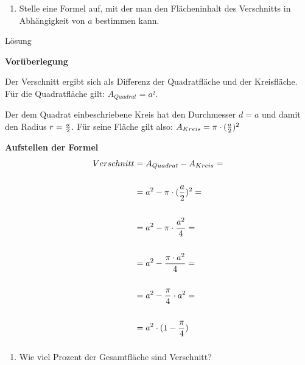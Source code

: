 \documentclass[
  ngerman,
]{book}
\providecommand{\tightlist}{%
  \setlength{\itemsep}{0pt}\setlength{\parskip}{0pt}}
\begin{document}
\hypertarget{section-42}{%
\subsubsection*{}\label{section-42}}

\begin{enumerate}
\def\labelenumi{\alph{enumi})}
\setcounter{enumi}{1}
\tightlist
\item
  Stelle eine Formel auf, mit der man den Flächeninhalt des Verschnitts in Abhängigkeit von \(a\) bestimmen kann.
\end{enumerate}

Lösung

\textbf{Vorüberlegung}

Der Verschnitt ergibt sich als Differenz der Quadratfläche und der Kreisfläche. Für die Quadratfläche gilt: \(A_{Quadrat}=a²\).

Der dem Quadrat einbeschriebene Kreis hat den Durchmesser \(d=a\) und damit den Radius \(r= {a \over 2}\). Für seine Fläche gilt also: \(A_{Kreis} = \pi \cdot ({a \over 2})^2\)

\textbf{Aufstellen der Formel}
\[ \begin{align} Verschnitt &= A_{Quadrat} - A_{Kreis} =\\
{}\\
                            &= a^2 - \pi \cdot ({a \over 2})^2 = \\
                            {}\\
                            & = a^2 - \pi \cdot {a^2 \over 4} = \\
                            {}\\
                            & = a^2 - {\pi \cdot a^2 \over 4} = \\
                            {}\\
                            & = a^2 - {\pi \over 4} \cdot a^2 =\\
                            {}\\
                            & = a^2 \cdot (1 - {\pi \over 4})
\end{align}\]

\hypertarget{section-43}{%
\subsubsection*{}\label{section-43}}

\begin{enumerate}
\def\labelenumi{\alph{enumi})}
\setcounter{enumi}{2}
\tightlist
\item
  Wie viel Prozent der Gesamtfläche sind Verschnitt?
\end{enumerate}
\end{document}
